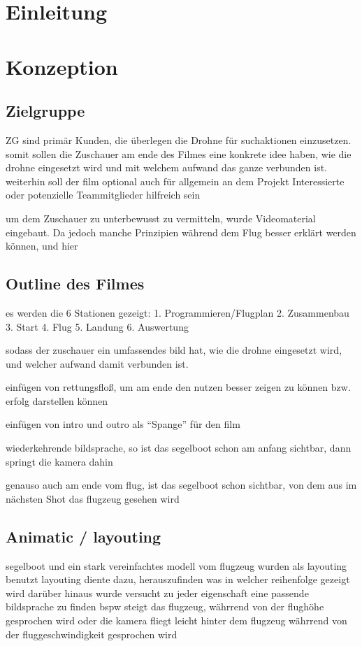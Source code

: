 \chapter{Einleitung}

\chapter{Konzeption}
\label{ch:intro}
\section{Zielgruppe}
\label{sec:intro:motivation}


ZG sind primär Kunden, die überlegen die Drohne für suchaktionen einzusetzen.
somit sollen die Zuschauer am ende des Filmes eine konkrete idee haben, wie die drohne eingesetzt wird und mit welchem aufwand das ganze verbunden ist.
weiterhin soll der film optional auch für allgemein an dem Projekt Interessierte oder potenzielle Teammitglieder hilfreich sein

um dem Zuschauer zu unterbewusst zu vermitteln, wurde Videomaterial eingebaut. Da jedoch manche Prinzipien während dem Flug besser erklärt werden können, und hier 


\section{Outline des Filmes}
\label{sec:intro:goal}
es werden die 6 Stationen gezeigt:
1. Programmieren/Flugplan
2. Zusammenbau
3. Start
4. Flug
5. Landung
6. Auswertung

sodass der zuschauer ein umfassendes bild hat, wie die drohne eingesetzt wird, und welcher aufwand damit verbunden ist.

einfügen von rettungsfloß, um am ende den nutzen besser zeigen zu können
bzw. erfolg darstellen können

einfügen von intro und outro als ``Spange'' für den film

wiederkehrende bildsprache, so ist das segelboot schon am anfang sichtbar, dann springt die kamera dahin

genauso auch am ende vom flug, ist das segelboot schon sichtbar, von dem aus im nächsten Shot das flugzeug gesehen wird

\section{Animatic / layouting}
\label{sec:intro:structure}
segelboot und ein stark vereinfachtes modell vom flugzeug wurden als layouting benutzt
layouting diente dazu, herauszufinden was in welcher reihenfolge gezeigt wird
darüber hinaus wurde versucht zu jeder eigenschaft eine passende bildsprache zu finden
bspw steigt das flugzeug, währrend von der flughöhe gesprochen wird
oder die kamera fliegt leicht hinter dem flugzeug währrend von der fluggeschwindigkeit gesprochen wird

